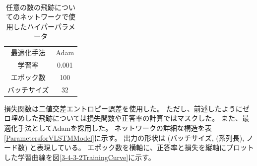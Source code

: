 \begin{table}[htb]
 \centering
　\small
  \begin{tabular}{c c}\hline
    最適化手法 & Adam\\
    学習率 & 0.001\\
    エポック数 & 100\\
    バッチサイズ & 32\\\hline
  \end{tabular}
  \caption{任意の数の飛跡についてのネットワークで使用したハイパーパラメータ}
  \label{HyperparametersforVLSTMModel}
\end{table}

損失関数は二値交差エントロピー誤差を使用した。
ただし、前述したようにゼロ埋めした飛跡については損失関数や正答率の計算ではマスクした。
また、最適化手法としてAdamを採用した。
ネットワークの詳細な構造を表\ref{ParametersforVLSTMModel}に示す。
出力の形状は (バッチサイズ, (系列長), ノード数) と表現している。
エポック数を横軸に、正答率と損失を縦軸にプロットした学習曲線を図\ref{3-4-3-2TrainingCurve}に示す。



